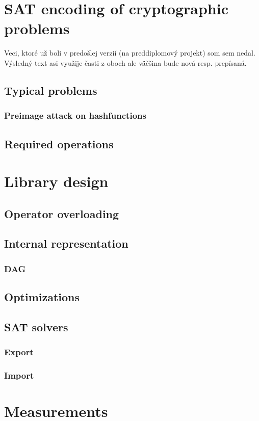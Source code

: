 \chapter{SAT encoding of cryptographic problems}

\begin{framed}
\noindent Veci, ktoré už boli v predošlej verzií (na preddiplomový projekt) som sem nedal. Výsledný text asi využije časti z oboch ale väčšina bude nová resp. prepísaná.
\end{framed}


\section{Typical problems}
\subsection{Preimage attack on hashfunctions}

\section{Required operations}

\chapter{Library design}

\section{Operator overloading}

\section{Internal representation}
\subsection{DAG}

\section{Optimizations}

\section{SAT solvers}
\subsection{Export}
\subsection{Import}

\chapter{Measurements}
